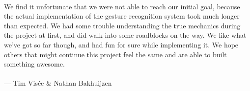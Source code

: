 \documentclass[a4paper]{article}
\begin{document}
  \paragraph{}
  We find it unfortunate that we were not able to reach our initial goal,
  because the actual implementation of the gesture recognition system took much
  longer than expected. We had some trouble understanding the true mechanics
  during the project at first, and did walk into some roadblocks on the way.
  We like what we've got so far though, and had fun for sure while implementing
  it. We hope others that might continue this project feel the same and are able
  to built something awesome.

  \paragraph{}
  --- Tim Visée \& Nathan Bakhuijzen
\end{document}
